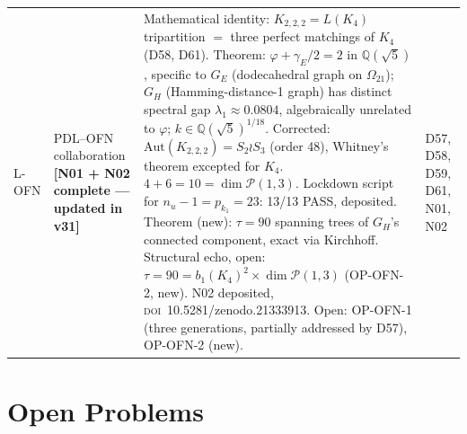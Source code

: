 \documentclass[11pt,a4paper]{article}
\theoremstyle{plain}
\theoremstyle{definition}
\theoremstyle{remark}
\begin{document}
\begin{longtable}{L{0.6cm}L{3.0cm}L{5.5cm}L{4.0cm}}
L-OFN & PDL--OFN collaboration \textbf{[N01 + N02 complete --- updated in v31]} & \textcolor{proofblue}{Mathematical identity}: $K_{2,2,2}=L(K_4)$ tripartition $=$ three perfect matchings of $K_4$ (D58, D61). \textcolor{proofblue}{Theorem}: $\varphi+\gamma_E/2=2$ in $\mathbb{Q}(\sqrt{5})$, specific to $G_E$ (dodecahedral graph on $\Omega_{21}$); $G_H$ (Hamming-distance-1 graph) has distinct spectral gap $\lambda_1\approx0.0804$, algebraically unrelated to $\varphi$; $k\in\mathbb{Q}(\sqrt{5})^{1/18}$. \textcolor{proofblue}{Corrected}: $\mathrm{Aut}(K_{2,2,2})=S_2\wr S_3$ (order 48), Whitney's theorem excepted for $K_4$. $4+6=10=\dim\mathcal{P}(1,3)$. Lockdown script for $n_u-1=p_{k_1}=23$: 13/13 PASS, deposited. \textcolor{proofblue}{Theorem} (new): $\tau=90$ spanning trees of $G_H$'s connected component, exact via Kirchhoff. \textcolor{openproblemred}{Structural echo, open}: $\tau=90=b_1(K_4)^2\times\dim\mathcal P(1,3)$ (OP-OFN-2, new). N02 deposited, \textsc{doi}~10.5281/zenodo.21333913. Open: OP-OFN-1 (three generations, partially addressed by D57), OP-OFN-2 (new). & D57, D58, D59, D61, N01, N02\\[0.3em]
\end{longtable}

\section{Open Problems}
\label{sec:openproblems}
\end{document}
